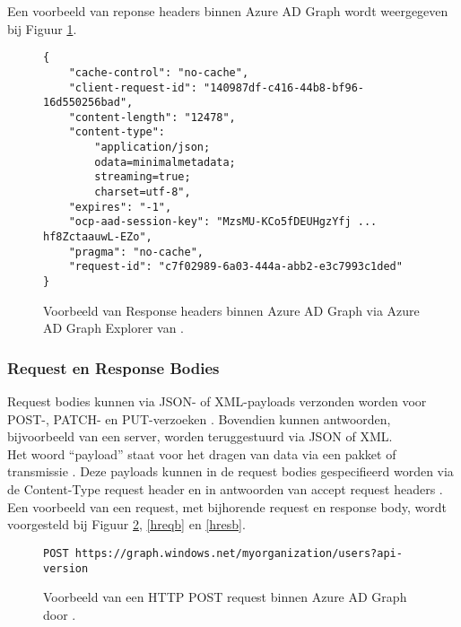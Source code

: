 Een voorbeeld van reponse headers binnen Azure \ac{AD} Graph wordt weergegeven bij Figuur \ref{rhaad}. \\

\begin{figure}[h!]
    \scriptsize
    \begin{verbatim} 
{
    "cache-control": "no-cache",
    "client-request-id": "140987df-c416-44b8-bf96-16d550256bad",
    "content-length": "12478",
    "content-type": 
        "application/json; 
        odata=minimalmetadata; 
        streaming=true; 
        charset=utf-8",
    "expires": "-1",
    "ocp-aad-session-key": "MzsMU-KCo5fDEUHgzYfj ... hf8ZctaauwL-EZo",
    "pragma": "no-cache",
    "request-id": "c7f02989-6a03-444a-abb2-e3c7993c1ded"
}
    \end{verbatim}
    \caption[Voorbeeld Response headers Azure AD Graph]{Voorbeeld van Response headers binnen Azure \ac{AD} Graph via Azure \Ac{AD} Graph Explorer van \textcite{Microsoft}.}
    \label{rhaad}
\end{figure}




\subsubsection{Request en Response Bodies}


Request bodies kunnen via \Ac{JSON}- of \ac{XML}-payloads verzonden worden voor POST-, PATCH- en PUT-verzoeken \autocite{Microsoft2015}. Bovendien kunnen antwoorden, bijvoorbeeld van een server, worden teruggestuurd via \ac{JSON} of \ac{XML}. \\

Het woord “payload” staat voor het dragen van data via een pakket of transmissie \autocite{Comer2006}. Deze payloads kunnen in de request bodies gespecifieerd worden via de Content-Type request header en in antwoorden van accept request headers \autocite{Microsoft2015}. Een voorbeeld van een request, met bijhorende request en response body, wordt voorgesteld bij Figuur \ref{hpr}, \ref{hreqb} en \ref{hresb}. \\

\begin{figure}[h!]
    \scriptsize
    \begin{verbatim}
POST https://graph.windows.net/myorganization/users?api-version
    \end{verbatim}
    \caption[Voorbeeld HTTP POST request]{Voorbeeld van een \ac{HTTP} POST request binnen Azure \ac{AD} Graph door \textcite{Microsoft2015}.}
    \label{hpr}
\end{figure}

